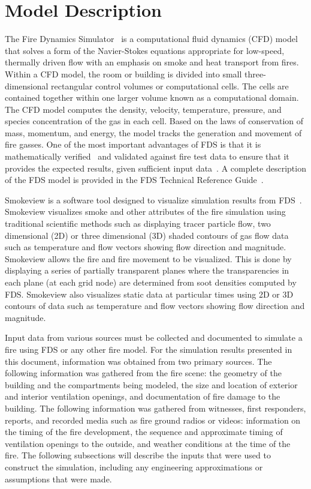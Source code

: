 \documentclass[12pt,oneside]{book}
\begin{document}
\chapter{Model Description}
\label{model}
The Fire Dynamics Simulator~\cite{FDS_Users_Guide} is a computational fluid dynamics (CFD) model that solves a form of the Navier-Stokes equations appropriate for low-speed, thermally driven flow with an emphasis on smoke and heat transport from fires.  Within a CFD model, the room or building is divided into small three-dimensional rectangular control volumes or computational cells.  The cells are contained together within one larger volume known as a computational domain.  The CFD model computes the density, velocity, temperature, pressure, and species concentration of the gas in each cell.  Based on the laws of conservation of mass, momentum,  and energy, the model tracks the generation and movement of fire gasses. One of the most important advantages of FDS is that it is  mathematically verified~\cite{FDS_Verification_Guide} and validated against fire test data to ensure that it provides the expected results, given sufficient input data~\cite{FDS_Validation_Guide}.  A complete description of the FDS model is provided in the FDS Technical Reference Guide~\cite{FDS_Math_Guide}.

Smokeview is a software tool designed to visualize simulation results from FDS~\cite{Smokeview_Users_Guide}.  Smokeview visualizes smoke and other attributes of the fire simulation using traditional scientific methods such as displaying tracer particle flow, two dimensional (2D) or three dimensional (3D) shaded contours of gas flow data such as temperature and flow vectors showing flow direction and magnitude.  Smokeview allows the fire and fire movement to be visualized.  This is done by displaying a series of partially transparent planes where the transparencies in each plane (at each grid node) are determined from soot densities computed by FDS.  Smokeview also visualizes static data at particular times using 2D or 3D contours of data such as temperature and flow vectors showing flow direction and magnitude.

Input data from various sources must be collected and documented to simulate a fire using FDS or any other fire model. For the simulation results presented in this document, information was obtained from two primary sources. The following information was gathered from the fire scene: the geometry of the building and the compartments being modeled, the size and location of exterior and interior ventilation openings, and documentation of fire damage to the building. The following information was gathered from witnesses, first responders, reports, and recorded media such as fire ground radios or videos: information on the timing of the fire development, the sequence and approximate timing of ventilation openings to the outside, and weather conditions at the time of the fire. The following subsections will describe the inputs that were used to construct the simulation, including any engineering approximations or assumptions that were made.
\end{document}
